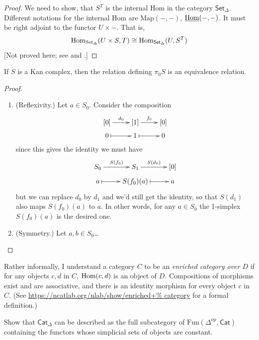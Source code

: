 \begin{proof}
We need to show, that $S^T$ is the internal
Hom in the category
$\mathsf{Set}_\Delta$. Different notations
for the internal Hom
are $\text{Map}(-,-)$,
$\underline{\mathop{\mathrm{Hom}}\nolimits}(-,-)$.
It must be right adjoint to
the functor $U \times -$.
That is,
$$
\mathop{\mathrm{Hom}}\nolimits_{\text{Set}_\Delta}(U \times
S,T)\cong\mathop{\mathrm{Hom}}\nolimits_{\mathsf{Set}_\Delta}(U,S^T)
$$
[Not proved here; see
\cite[Theorem 1.1.10 (Kan)]{Cisinsky} and
\cite[Remark 1.1.11]{Cisinsky}.]


\end{proof}

\begin{exercise}[1.1]
\label{exercise-relat-equiv-relat}
If $S$ is a Kan complex, then the relation
defining
$\pi_0S$ is an equivalence relation.
\end{exercise}

\begin{proof}
\begin{enumerate}
\item (Reflexivity.) Let $a \in S_0$.
Consider the composition
$$
\xymatrix@R=0.5em{
[0]\ar[r]^{d_0}& [1]\ar[r]^{f_0}& [0]\\
0\ar@{|->}[r]& 1\ar@{|->}[r]&0
}
$$
since this gives the identity we must have
$$
\xymatrix@R=0.5em{
S_0\ar[r]^{S(f_0)}& S_1\ar[r]^{S(d_0)}& [0]\\
a\ar@{|->}[r]& S(f_0)(a)\ar@{|->}[r]&a
}
$$
but we can replace $d_0$ by $d_1$ and we'd
still get the identity,
so that $S(d_1)$ also maps $S(f_0)(a)$ to
$a$. In other words,
for any  $a \in S_0$ the 1-simplex
$S(f_0)(a)$ is the desired one.
\item (Symmetry.) Let $a,b \in S_0$…
\end{enumerate}
\end{proof}

Rather informally, I understand a category
$C$ to be
an {\it enriched category over $D$} if for
any objects
$c,d$ in $C$, $\mathop{\mathrm{Hom}}\nolimits(c,d)$ is an object of
$D$.
Compositions of morphisms exist and are
associative,
and there is an identity morphism for every
object $c$ in $C$.
(See
\url{https://ncatlab.org/nlab/show/enriched+%
category}
for a formal definition.)

\begin{exercise}[1.2]
\label{exercise-enric-simpl-set-categ-subc}
Show that $\mathsf{Cat}_\Delta$ can be
described as the full
subcategory of
$\text{Fun}(\Delta^{\text{op}},\mathsf{Cat})$
containing the functors whose simplicial sets
of objects
are constant.
\end{exercise}

